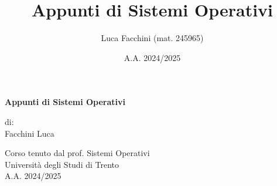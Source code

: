\documentclass[a4paper,twoside]{book}
\title{Appunti di Sistemi Operativi}
\author{Luca Facchini (mat. 245965)}
\date{A.A. 2024/2025}
\begin{document}
    \frontmatter

    \begin{titlepage}
        \centering  %
        {\Huge\textbf{Appunti di Sistemi Operativi}} \\[1cm] %
        \vspace{1.5cm}
        
        {\normalsize di: } \\[.3cm]
        {\Large Facchini Luca} \\ %
        \vspace{1.5cm}
        

        {\normalsize Corso tenuto dal prof. Sistemi Operativi} \\[0.3cm] %
        {\large Università degli Studi di Trento} \\[1.5cm]
        
        {\large A.A. 2024/2025} \\[3cm] %
        

\end{titlepage}
\end{document}
